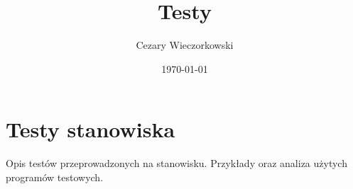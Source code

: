 \documentclass[../main.tex]{subfiles}
\author{Cezary Wieczorkowski}
\date{\today}
\title{Testy}
\begin{document}
\section{Testy stanowiska}

Opis testów przeprowadzonych na stanowisku. Przykłady oraz analiza użytych programów testowych.
\end{document}
